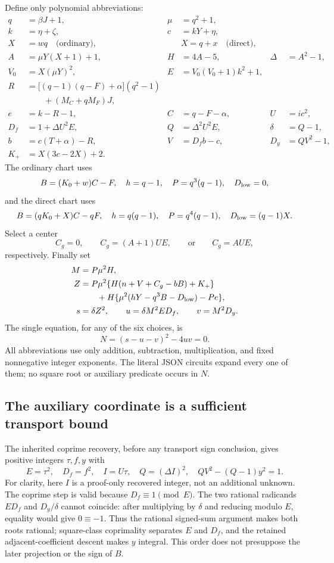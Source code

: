 Define only polynomial abbreviations:
\begin{align*}
 q&=\beta J+1,& \mu&=q^2+1,\\
 k&=\eta+\zeta,&c&=kY+\eta,\\
 X&=wq\quad\text{(ordinary)},&&
 X=q+x\quad\text{(direct)},\\
 A&=\mu Y(X+1)+1,&H&=4A-5,&\Delta&=A^2-1,\\
 V_0&=X(\mu Y)^2,&E&=V_0(V_0+1)k^2+1,\\
 R&=\bigl[(q-1)(q-F)+\alpha\bigr](q^2-1)\\
  &\qquad +(M_C+qM_F)J,\\
 e&=k-R-1,&C&=q-F-\alpha,&U&=ic^2,\\
 D_f&=1+\Delta U^2E,&Q&=\Delta^2U^2E,&\delta&=Q-1,\\
 b&=c(T+\alpha)-R,&V&=D_fb-c,&D_y&=QV^2-1,\\
 K_+&=X(3c-2X)+2.
\end{align*}
The ordinary chart uses
\[
 B=(K_0+w)C-F,\quad h=q-1,\quad P=q^3(q-1),\quad D_{\rm low}=0,
\]
and the direct chart uses
\[
 B=(qK_0+X)C-qF,\quad h=q(q-1),\quad
 P=q^4(q-1),\quad D_{\rm low}=(q-1)X.
\]
Select a center
\[
 C_g=0,\qquad C_g=(A+1)UE,\qquad\text{or}\qquad C_g=AUE,
\]
respectively. Finally set
\begin{align*}
 M&=P\mu^2H,\\
 Z&=P\mu^2\{H(n+V+C_g-bB)+K_+\}\\
  &\qquad +H\{\mu^2(hY-q^3B-D_{\rm low})-Pe\},\\
 s&=\delta Z^2,\qquad u=\delta M^2ED_f,\qquad v=M^2D_y.
\end{align*}
The single equation, for any of the six choices, is
\[
 \boxed{N=(s-u-v)^2-4uv=0.}
 \tag{16}\label{eq:positiveN}
\]
All abbreviations use only addition, subtraction, multiplication, and fixed
nonnegative integer exponents. The literal JSON circuits expand every one
of them; no square root or auxiliary predicate occurs in $N$.

\subsection{The auxiliary coordinate is a sufficient transport bound}
The inherited coprime recovery, before any transport sign conclusion, gives
positive integers $\tau,f,y$ with
\[
 E=\tau^2,\quad D_f=f^2,\quad I=U\tau,\quad
 Q=(\Delta I)^2,\quad QV^2-(Q-1)y^2=1.
 \tag{17}\label{eq:recovered}
\]
For clarity, here $I$ is a proof-only recovered integer, not an additional
unknown. The coprime step is valid because $D_f\equiv1\pmod E$.
The two rational radicands $ED_f$ and $D_y/\delta$ cannot coincide:
after multiplying by $\delta$ and reducing modulo $E$, equality would give
$0\equiv-1$. Thus the rational signed-sum argument makes both roots
rational; square-class coprimality separates $E$ and $D_f$, and the
retained adjacent-coefficient descent makes $y$ integral. This order does
not presuppose the later projection or the sign of $B$.

